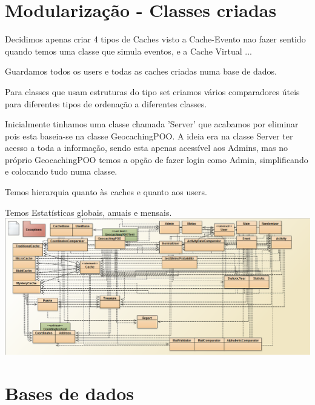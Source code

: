 \documentclass{article}
\begin{document}

\section{Modularização - Classes criadas}

\quad Decidimos apenas criar 4 tipos de Caches visto a Cache-Evento nao fazer sentido quando temos uma classe que simula eventos, e a Cache Virtual ...
\par Guardamos todos os users e todas as caches criadas numa base de dados.
\par Para classes que usam estruturas do tipo set criamos vários comparadores úteis para diferentes tipos de ordenação a diferentes classes.
\par Inicialmente tinhamos uma classe chamada 'Server' que acabamos por eliminar pois esta baseia-se na classe GeocachingPOO. A ideia era na classe Server ter acesso a toda a informação, sendo esta apenas acessível aos Admins, mas no próprio GeocachingPOO temos a opção de fazer login como Admin, simplificando e colocando tudo numa classe.
\par Temos hierarquia quanto às caches e quanto aos users.
\par Temos Estatísticas globais, anuais e mensais.
\\
\includegraphics[height=8\baselineskip,natwidth=369,natheight=430]{Diagrama.PNG}

\pagebreak
\section{Bases de dados}
\end{document}
